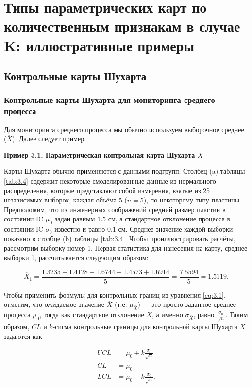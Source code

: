 \section{Типы параметрических карт по количественным признакам в случае K: иллюстративные примеры}

\subsection{Контрольные карты Шухарта}

\subsubsection{Контрольные карты Шухарта для мониторинга среднего процесса}
Для мониторинга среднего процесса мы обычно используем выборочное среднее (\(\overline{X}\)). Далее следует пример.

\noindent\textbf{Пример 3.1. Параметрическая контрольная карта Шухарта \(\overline{X}\)}

Карты Шухарта обычно применяются с данными подгрупп. Столбец (a) таблицы \ref{tab:3.4} содержит некоторые смоделированные данные из нормального распределения, которые представляют собой измерения, взятые из 25 независимых выборок, каждая объёма 5 (\(n = 5\)), по некоторому типу пластины. Предположим, что из инженерных соображений средний размер пластин в состоянии IC \(\mu_0\) задан равным \(1.5\) см, а стандартное отклонение процесса в состоянии IC \(\sigma_0\) известно и равно \(0.1\) см. Среднее значение каждой выборки показано в столбце (b) таблицы \ref{tab:3.4}. Чтобы проиллюстрировать расчёты, рассмотрим выборку номер 1. Первая статистика для нанесения на карту, среднее выборки 1, рассчитывается следующим образом:

\[
\overline{X}_1 = \frac{1.3235 + 1.4128 + 1.6744 + 1.4573 + 1.6914}{5} = \frac{7.5594}{5} = 1.5119.
\]

Чтобы применить формулы для контрольных границ из уравнения \eqref{eq:3.1}, отметим, что ожидаемое значение \(\overline{X}\) (т.е. \(\mu_{\overline{X}}\)) — это просто заданное среднее процесса \(\mu_0\), тогда как стандартное отклонение \(\overline{X}\), а именно \(\sigma_{\overline{X}}\), равно \(\frac{\sigma_0}{\sqrt{n}}\). Таким образом, \(CL\) и \(k\)-сигма контрольные границы для контрольной карты Шухарта \(\overline{X}\) задаются как

\begin{equation}
	\begin{aligned}
		UCL &= \mu_0 + k\frac{\sigma_0}{\sqrt{n}} \\
		CL &= \mu_0 \\
		LCL &= \mu_0 - k\frac{\sigma_0}{\sqrt{n}}.
	\end{aligned}
	\label{eq:3.13}
\end{equation}

